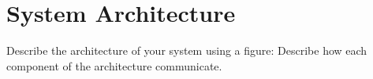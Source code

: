 \section{System Architecture}\label{sec:sa}
Describe the architecture of your system using a figure: Describe how each component of the architecture communicate. 
\clearpage